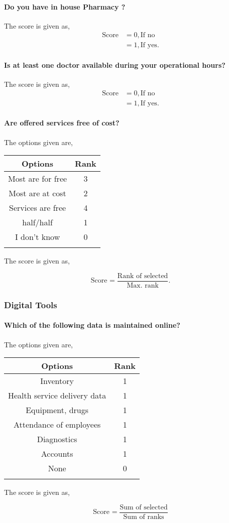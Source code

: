 \documentclass[oneside]{article}
\newcommand{\tsub}[2]{\text{#1}_{\text{#2}}}
\newcommand{\dsub}[2]{\dfrac{\text{#1}}{\text{#2}}}
\newcommand{\multsel}[1]
{
	\[
		\tsub{Score}{#1} = \dsub{Sum of selected}{Sum of ranks}
	\]
}
\newcommand{\singsel}[1]
{
	\[
		\tsub{Score}{#1} = \dsub{Rank of selected}{Max. rank}.
	\]
}
\newenvironment{ttable}
{
\begin{center}
\begin{tabular}{c|c}
\hline
}
{
\\ \hline
\end{tabular}
\end{center}
}
\begin{document}
\paragraph{ Do you have in house Pharmacy ?}

The score is given as,
\begin{align*}
\tsub{Score}{} &= 0, \text{If no} \\
        &= 1, \text{If yes}.
\end{align*}
\paragraph{ Is at least one doctor available during your operational hours?}

The score is given as,
\begin{align*}
\tsub{Score}{} &= 0, \text{If no} \\
        &= 1, \text{If yes}.
\end{align*}
\paragraph{ Are offered services free of cost?}
The options given are,
\begin{ttable}
Options & Rank \\ \hline
Most are for free & 3 \\
Most are at cost & 2 \\
Services are free & 4 \\
half/half & 1 \\
I don't know & 0 \\
\hline
\end{ttable}
The score is given as,
\singsel{}
\subsubsection{Digital Tools}

\paragraph{ Which of the following data is maintained online?}
The options given are,
\begin{ttable}
Options & Rank \\ \hline
Inventory & 1 \\
Health service delivery data & 1 \\
Equipment, drugs & 1 \\
Attendance of employees & 1 \\
Diagnostics & 1 \\
Accounts & 1 \\
None & 0 \\
\hline
\end{ttable}
The score is given as,
\multsel{}
\end{document}
